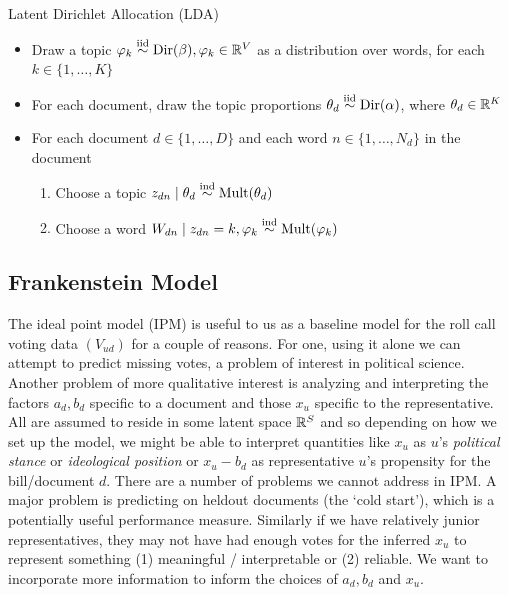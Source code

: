 \documentclass{article}
\begin{document}
\noindent Latent Dirichlet Allocation (LDA)
\begin{itemize}
\item Draw a topic $\varphi_k \stackrel{\tiny\text{iid}}{\sim} \text{Dir}(\beta), \varphi_k\in \mathbb{R}^V$ as a distribution over words, for each $k\in\{1,\dots,K\}$ 
\item For each document, draw the topic proportions $\theta_d \stackrel{\tiny\text{iid}}{\sim} \text{Dir}(\alpha)$, where $\theta_d\in \mathbb{R}^K$ %
\item For each document $d\in\{1,\dots,D\}$ and each word $n\in\{1,\dots,N_d\}$ in the document
\begin{enumerate}
\item Choose a topic $z_{dn}\mid \theta_d \stackrel{\tiny\text{ind}}{\sim} \text{Mult}(\theta_d)$ %
\item Choose a word $W_{dn}\mid z_{dn}=k, \varphi_k\stackrel{\tiny\text{ind}}{\sim} \text{Mult}(\varphi_k)$ %
\end{enumerate}
\end{itemize}


\newpage


\subsection{Frankenstein Model}

The ideal point model (IPM) is useful to us as a baseline model for the roll call voting data $(V_{ud})$ for a couple of reasons. For one, using it alone we can attempt to predict missing votes, a problem of interest in political science. Another problem of more qualitative interest is analyzing and interpreting the factors $a_d, b_d$ specific to a document and those $x_u$ specific to the representative. All are assumed to reside in some latent space $\mathbb{R}^S$ and so depending on how we set up the model, we might be able to interpret quantities like $x_u$ as $u$'s {\sl political stance} or {\sl ideological position} or $x_u - b_d$ as representative $u$'s propensity for the bill/document $d$. There are a number of problems we cannot address in IPM. A major problem is predicting on heldout documents (the `cold start'), which is a potentially useful performance measure. Similarly if we have relatively junior representatives, they may not have had enough votes for the inferred $x_u$ to represent something (1) meaningful / interpretable or (2) reliable. We want to incorporate more information to inform the choices of $a_d, b_d$ and $x_u$. \\
\end{document}
